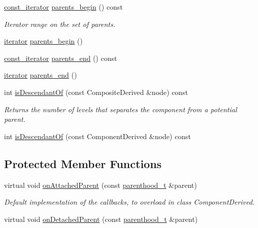 {\bf }\par
\begin{DoxyCompactItemize}
\item 
\hyperlink{classocra_1_1Component_a6271631f04d2911e4369d1288074eebb}{const\+\_\+iterator} \hyperlink{classocra_1_1Component_adb2a198a51ac5c523a41dea17f2bf317}{parents\+\_\+begin} () const 
\begin{DoxyCompactList}\small\item\em Iterator range on the set of parents. \end{DoxyCompactList}\item 
\hyperlink{classocra_1_1Component_a9b76b63c3248ec96dfdaca00d712c1c9}{iterator} \hyperlink{classocra_1_1Component_aaca1c77fdf2c7d090f43a3eefb671eae}{parents\+\_\+begin} ()
\item 
\hyperlink{classocra_1_1Component_a6271631f04d2911e4369d1288074eebb}{const\+\_\+iterator} \hyperlink{classocra_1_1Component_a4bc3500b7f809982241eb8e0ade0a1fa}{parents\+\_\+end} () const 
\item 
\hyperlink{classocra_1_1Component_a9b76b63c3248ec96dfdaca00d712c1c9}{iterator} \hyperlink{classocra_1_1Component_a15dc70cd778a884fd6aa27771189d091}{parents\+\_\+end} ()
\end{DoxyCompactItemize}

{\bf }\par
\begin{DoxyCompactItemize}
\item 
int \hyperlink{classocra_1_1Component_a0c2d25700a2409e81656439c46499310}{is\+Descendant\+Of} (const Composite\+Derived \&node) const 
\begin{DoxyCompactList}\small\item\em Returns the number of levels that separates the component from a potential parent. \end{DoxyCompactList}\item 
int \hyperlink{classocra_1_1Component_a952aa27a70031542b924cabaff917d3e}{is\+Descendant\+Of} (const Component\+Derived \&node) const 
\end{DoxyCompactItemize}

\subsection*{Protected Member Functions}
{\bf }\par
\begin{DoxyCompactItemize}
\item 
virtual void \hyperlink{classocra_1_1Component_aa59ac72499ba7d314d9602b081d0b475}{on\+Attached\+Parent} (const \hyperlink{classocra_1_1Component_a70fb7cda78934a9f017c7e46c1407953}{parenthood\+\_\+t} \&parent)
\begin{DoxyCompactList}\small\item\em Default implementation of the callbacks, to overload in class Component\+Derived. \end{DoxyCompactList}\item 
virtual void \hyperlink{classocra_1_1Component_a0dd26028434be8efbebccb088ddbec65}{on\+Detached\+Parent} (const \hyperlink{classocra_1_1Component_a70fb7cda78934a9f017c7e46c1407953}{parenthood\+\_\+t} \&parent)
\end{DoxyCompactItemize}

